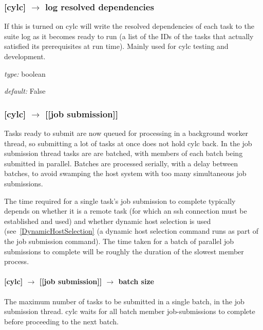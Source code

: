 \subsubsection[log resolved dependencies]{[cylc] $\rightarrow$ log resolved dependencies}

If this is turned on cylc will write the resolved dependencies of each
task to the suite log as it becomes ready to run (a list of the IDs of
the tasks that actually satisfied its prerequisites at run time). Mainly
used for cylc testing and development.

\begin{myitemize}
    \item {\em type:} boolean
    \item {\em default:} False
\end{myitemize}

\subsubsection[{[[}job submission{]]}]{[cylc] $\rightarrow$ [[job submission]]}

Tasks ready to submit are now queued for processing in a background
worker thread, so submitting a lot of tasks at once does not hold cylc
back.  In the job submission thread tasks are are batched, with members
of each batch being submitted in parallel. Batches are processed serially,
with a delay between batches, to avoid swamping the host system with too
many simultaneous job submissions.

The time required for a single task's job submission to complete
typically depends on whether it is a remote task (for which an ssh
connection must be established and used) and whether dynamic host
selection is used (see~\ref{DynamicHostSelection} (a dynamic host
selection command runs as part of the job submission command). The time
taken for a batch of parallel job submissions to complete will be
roughly the duration of the slowest member process.

\paragraph[batch size]{[cylc] $\rightarrow$ [[job submission]] $\rightarrow$ batch size}

The maximum number of tasks to be submitted in a single batch, in the
job submission thread. cylc waits for all batch member job-submissions
to complete before proceeding to the next batch.

